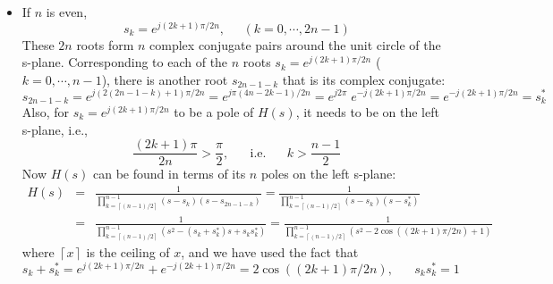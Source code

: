 \documentclass{article}
\begin{document}

  \begin{itemize}
  \item If $n$ is even, 
    \begin{equation}
    s_k=e^{j(2k+1)\pi/2n},\;\;\;\;\;(k=0,\cdots,2n-1)
    \end{equation}
    These $2n$ roots form $n$ complex conjugate pairs around the unit 
    circle of the s-plane. Corresponding to each of the $n$ roots 
    $s_k=e^{j(2 k+1)\pi/2n}$ ($k=0,\cdots,n-1$), there is another root
    $s_{2n-1-k}$ that is its complex conjugate:
    \begin{equation}
      s_{2n-1-k}=e^{j(2(2n-1-k)+1)\pi/2n}=e^{j\pi(4n-2k-1)/2n}
      =e^{j2\pi} \;e^{-j(2k+1)\pi/2n} =e^{-j(2 k+1)\pi/2n}=s_k^*
    \end{equation}
    Also, for $s_k=e^{j(2k+1)\pi/2n}$ to be a pole of $H(s)$, it needs to be on 
    the left s-plane, i.e.,
    \begin{equation}
      \frac{(2k+1)\pi}{2n}>\frac{\pi}{2},\;\;\;\;\;\;\mbox{i.e.}\;\;\;\;\;\;
      k>\frac{n-1}{2}
    \end{equation}
    Now $H(s)$ can be found in terms of its $n$ poles on the left s-plane:
    \begin{eqnarray}
      H(s)&=&\frac{1}{\prod_{k=\left\lceil (n-1)/2 \right\rceil}^{n-1} (s-s_k)(s-s_{2n-1-k})}
      =\frac{1}{\prod_{k=\left\lceil (n-1)/2 \right\rceil}^{n-1}(s-s_k)(s-s_k^*)}
      \nonumber \\
      &=&\frac{1}{\prod_{k=\left\lceil (n-1)/2 \right\rceil}^{n-1}(s^2-(s_k+s_k^*)s+s_ks_k^*)}
      =\frac{1}{\prod_{k=\left\lceil (n-1)/2 \right\rceil}^{n-1}(s^2-2\cos((2 k+1)\pi/2n)+1)}
    \end{eqnarray}
    where $\left\lceil x\right\rceil$ is the ceiling of $x$, and we have 
    used the fact that    
    \begin{equation}
      s_k+s_k^*=e^{j(2 k+1)\pi/2n}+e^{-j(2 k+1)\pi/2n} =2\cos((2 k+1)\pi/2n),
      \;\;\;\;\;\;      s_k s_k^*=1
    \end{equation}


\end{itemize}
\end{document}
